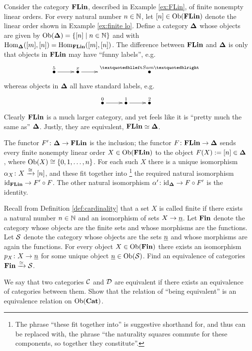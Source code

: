 \documentclass[CT4S-EN-RU]{subfiles}
\begin{document}
\begin{example}\label{ex:finite linear orders}

Consider the category ${\bf FLin}$, described in Example \ref{ex:FLin}, of finite nonempty linear orders. For every natural number $n\in{\mathbb N}$, let $[n]\in\textnormal{Ob}({\bf FLin})$ denote the linear order shown in Example \ref{ex:finite lo}. Define a category ${\bf \Delta}$ whose objects are given by $\textnormal{Ob}({\bf \Delta})=\{[n]{\;|\;}n\in{\mathbb N}\}$ and with $\textnormal{Hom}_{{\bf \Delta}}([m],[n])=\textnormal{Hom}_{{\bf FLin}}([m],[n])$. The difference between ${\bf FLin}$ and ${\bf \Delta}$ is only that objects in ${\bf FLin}$ may have “funny labels”, e.g. 
$$\xymatrix{\LMO{5}\ar[r]&\LMO{x}\ar[r]&\LMO{“Sam”}}$$ 
whereas objects in ${\bf \Delta}$ all have standard labels, e.g.
$$\xymatrix{\LMO{0}\ar[r]&\LMO{1}\ar[r]&\LMO{2}}$$
Clearly ${\bf FLin}$ is a much larger category, and yet feels like it is “pretty much the same as” ${\bf \Delta}$. Justly, they are equivalent, ${\bf FLin}\simeq{\bf \Delta}$. 

The functor $F'\colon{\bf \Delta}\rightarrow{\bf FLin}$ is the inclusion; the functor $F\colon{\bf FLin}\rightarrow{\bf \Delta}$ sends every finite nonempty linear order $X\in\textnormal{Ob}({\bf FLin})$ to the object $F(X):=[n]\in{\bf \Delta}$, where $\textnormal{Ob}(X)\cong\{0,1,\ldots,n\}$. For each such $X$ there is a unique isomorphism $\alpha_X\colon X\xrightarrow{\cong}[n]$, and these fit together into
\footnote{The phrase “these fit together into” is suggestive shorthand for, and thus can be replaced with, the phrase “the naturality squares commute for these components, so together they constitute”.}
the required natural isomorphism $\textnormal{id}_{{\bf FLin}}\rightarrow F'\circ F$. The other natural isomorphism $\alpha'\colon\textnormal{id}_{{\bf \Delta}}\rightarrow F\circ F'$ is the identity.

\end{example}

\begin{exercise}
Recall from Definition \ref{def:cardinality} that a set $X$ is called finite if there exists a natural number $n\in{\mathbb N}$ and an isomorphism of sets $X\rightarrow\underline{n}$. Let ${\bf Fin}$ denote the category whose objects are the finite sets and whose morphisms are the functions. Let $\mathcal{S}$ denote the category whose objects are the sets $\underline{n}$ and whose morphisms are again the functions. For every object $X\in\textnormal{Ob}({\bf Fin})$ there exists an isomorphism $p_X\colon X\rightarrow\underline{n}$ for some unique object $\underline{n}\in\textnormal{Ob}(\mathcal{S})$. Find an equivalence of categories ${\bf Fin}\xrightarrow{\simeq}\mathcal{S}$. 
\end{exercise}

\begin{exercise}
We say that two categories $\mathcal{C}$ and $\mathcal{D}$ are equivalent if there exists an equivalence of categories between them. Show that the relation of “being equivalent” is an equivalence relation on $\textnormal{Ob}({\bf Cat})$.
\end{exercise}
\end{document}
